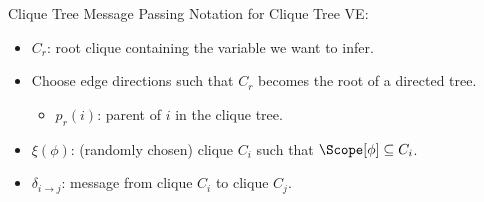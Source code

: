 \begin{frame}{Clique Tree Message Passing}
    Notation for Clique Tree VE:
    \begin{itemize}
        \item $C_r$: root clique containing the variable we want to infer.
        \pause \item Choose edge directions such that $C_r$ becomes the root of a directed tree.
        \begin{itemize}
            \pause \item $p_r(i)$: parent of $i$ in the clique tree.
        \end{itemize}
        \pause \item $\xi(\phi)$: (randomly chosen) clique $C_i$ such that $\Scope[\phi] \subseteq C_i$.
        \pause \item $\delta_{i \rightarrow j}$: message from clique $C_i$ to clique $C_j$.
    \end{itemize}
    \pause
    \begin{algorithm}[H]
    \label{alg:clique-tree-variable-elimination}
    \caption{Upward Pass Clique Tree VE}
    \pause
    \pause
    \end{algorithm}
\end{frame}

